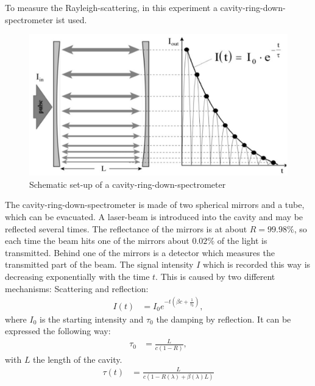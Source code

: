 \documentclass[
	parskip=half,10pt,
	numbers= noenddot, %
	toc=flat, %
	oneside,
	twocolumn,
	]{scrartcl}
\begin{document}
To measure the Rayleigh-scattering, in this experiment a cavity-ring-down-spectrometer ist used. 
\begin{figure}[h]
\includegraphics[width=.48 \textwidth]{images/crds.pdf}
\caption{Schematic set-up of a cavity-ring-down-spectrometer \cite{wiki}}
\label{fig:set-up}
\end{figure}
The cavity-ring-down-spectrometer is made of two spherical mirrors and a tube, which can be evacuated. A laser-beam is introduced into the cavity and may be reflected 
several times. The reflectance of the mirrors is at about $R=99.98 \%$, so each time the beam hits one of the mirrors about $0.02\%$ of the light is 
transmitted. Behind one of the mirrors is a detector which measures the transmitted part of the beam. The signal intensity $I$ which is recorded this way is 
decreasing exponentially with the time $t$. This is caused by two different mechanisms: Scattering and reflection:
\begin{align}
I(t) &= I_0 e^{- t \left ( \beta c + \frac{1}{\tau_0} \right )},
\end{align}
where $I_0$ is the starting intensity and $\tau_0$ the damping by reflection. It can be expressed the following way:
\begin{align}
\tau_0 &= \frac{L}{c(1-R)},
\end{align}
with $L$ the length of the cavity. 
\begin{align}
\tau(t) &= \frac{L}{c(1-R(\lambda) + \beta(\lambda)L)}
\end{align}


\newpage


\end{document}
